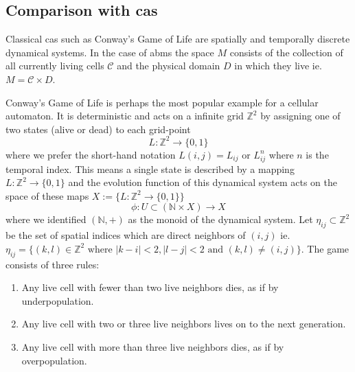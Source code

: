 \subsection{Comparison with \aclp{ca}}
\label{section:comparison-with-ca}
Classical \acp{ca} such as Conway's Game of Life \cite{games1970fantastic} 
are spatially and temporally discrete dynamical systems.
In the case of \acp{abm} the space $M$ consists of the collection of all currently living cells
$\mathscr{C}$ and the physical domain $D$ in which they live ie. $M=\mathscr{C}\times D$.

\begin{example}
    \label{example:game-of-life}
    Conway's Game of Life is perhaps the most popular example for a cellular automaton.
    It is deterministic and acts on a infinite grid $\mathbb{Z}^2$ by assigning one of two states
    (alive or dead) to each grid-point
    \begin{equation}
        L:\mathbb{Z}^2\rightarrow\{0,1\}
    \end{equation}
    where we prefer the short-hand notation $L(i,j)=L_{ij}$ or $L^n_{ij}$ where $n$ is the temporal
    index.
    This means a single state is described by a mapping $L:\mathbb{Z}^2\rightarrow\{0,1\}$ and the
    evolution function of this dynamical system acts on the space of these maps
    $X:=\{L:\mathbb{Z}^2\rightarrow\{0,1\}\}$
    \begin{equation}
        \phi:U\subset(\mathbb{N}\times X) \rightarrow X
    \end{equation}
    where we identified $(\mathbb{N},+)$ as the monoid of the dynamical system.
    Let $\eta_{ij}\subset\mathbb{Z}^2$ be the set of spatial indices which are direct neighbors of
    $(i,j)$ ie. $\eta_{ij}=\{(k,l)\in\mathbb{Z}^2 \text{ where } |k-i|<2, |l-j|<2 \text{ and }
    (k,l)\neq(i,j)\}$.
    The game consists of three rules:
    \begin{enumerate}
        \item Any live cell with fewer than two live neighbors dies, as if by underpopulation.
        \item Any live cell with two or three live neighbors lives on to the next generation.
        \item Any live cell with more than three live neighbors dies, as if by overpopulation.

\end{enumerate}
\end{example}
